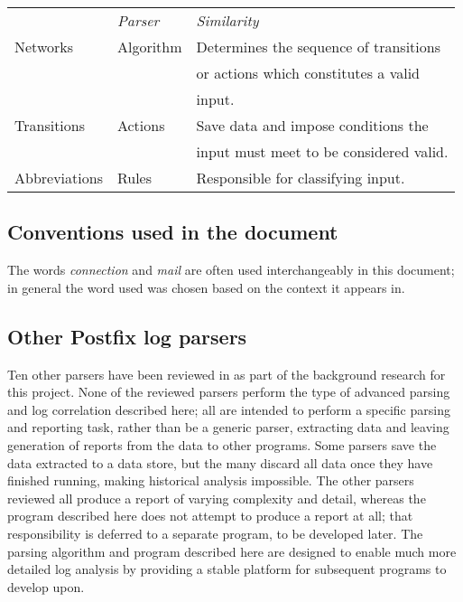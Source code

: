 
\begin{tabular}[]{lll}
    \textit{\ATN{}\/}   & \textit{Parser\/} & \textit{Similarity\/}     \\
    Networks            & Algorithm         & Determines the sequence 
                                              of transitions            \\
                        &                   & or actions which 
                                              constitutes a valid       \\
                        &                   & input.                    \\
    Transitions         & Actions           & Save data and impose
                                              conditions the            \\
                        &                   & input must meet to be
                                              considered valid.         \\
    Abbreviations       & Rules             & Responsible for 
                                              classifying input.        \\
\end{tabular}

\subsection{Conventions used in the document}

The words \textit{connection\/} and \textit{mail\/} are often used
interchangeably in this document; in general the word used was chosen based
on the context it appears in.

\subsection{Other Postfix log parsers}

Ten other parsers have been reviewed in  as part
of the background research for this project.  None of the reviewed parsers
perform the type of advanced parsing and log correlation described here;
all are intended to perform a specific parsing and reporting task, rather
than be a generic parser, extracting data and leaving generation of reports
from the data to other programs.  Some parsers save the data extracted to a
data store, but the many discard all data once they have finished running,
making historical analysis impossible.  The other parsers reviewed all
produce a report of varying complexity and detail, whereas the program
described here does not attempt to produce a report at all; that
responsibility is deferred to a separate program, to be developed later.
The parsing algorithm and program described here are designed to enable
much more detailed log analysis by providing a stable platform for
subsequent programs to develop upon.

